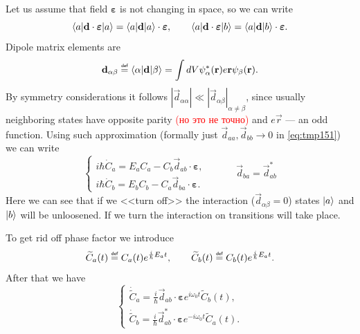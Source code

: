 Let us assume that field $\bm{\varepsilon}$ is not changing in space, so we can write
\begin{equation}
	\langle a\rvert \mathbf{d} \cdot \bm{\varepsilon} \lvert a\rangle = \langle a\rvert \mathbf{d} \lvert a\rangle \cdot \bm{\varepsilon}, \qquad 
	\langle a\rvert \mathbf{d} \cdot \bm{\varepsilon} \lvert b\rangle = \langle a\rvert \mathbf{d} \lvert b\rangle \cdot \bm{\varepsilon}.
\end{equation}
Dipole matrix elements are
\begin{equation}
	\vec{d}_{\alpha \beta} \myeq \bra{\alpha} \vec{d} \ket{\beta} = \int dV \psi_{\alpha}^* (\vec{r}) e \vec{r} \psi_{\beta} (\vec{r}).
\end{equation}
By symmetry considerations it follows  $\left| \vec{d}_{\alpha \alpha} \right| \ll \left| \vec{d}_{\alpha \beta} \right|_{\alpha \neq \beta}$, since usually neighboring states have opposite parity \textcolor{red}{(но это не точно)} and $e \vec{r}$ --- an odd function. Using such approximation (formally just $\vec{d}_{aa}, \vec{d}_{bb} \to 0$ in \eqref{eq:tmp151}) we can write
\begin{equation}
	\begin{cases}
		i \hbar \dot{C}_a = E_a C_a - C_b \vec{d}_{ab} \cdot \bm{\varepsilon}, \\
		i \hbar \dot{C}_b = E_b C_b - C_a \vec{d}_{ba} \cdot \bm{\varepsilon}.
	\end{cases} 
	\qquad \quad \vec{d}_{ba} = \vec{d}_{ab}^*
\end{equation}
Here we can see that if we <<turn off>> the interaction ($\vec{d}_{\alpha \beta} = 0$) states $\lvert a\rangle$ and $\lvert b\rangle$ will be unloosened. If we turn the interaction on transitions will take place. 

To get rid off phase factor we introduce
\begin{equation}
	\widetilde{C}_a (t) \myeq C_a(t) e^{\frac{i}{\hbar}E_a t}, \qquad \widetilde{C}_b (t) \myeq C_b(t) e^{\frac{i}{\hbar}E_a t}.
\end{equation}
After that we have
\begin{equation}
	\begin{cases}
		\dot{\widetilde{C}}_a = \frac{i}{\hbar}\vec{d}_{ab} \cdot \bm{\varepsilon} e^{i \omega_0 t} \widetilde{C}_b(t), \\
		\dot{\widetilde{C}}_b = \frac{i}{\hbar}\vec{d}^*_{ab} \cdot \bm{\varepsilon} e^{-i \omega_0 t} \widetilde{C}_a(t).
	\end{cases} 
\end{equation}

